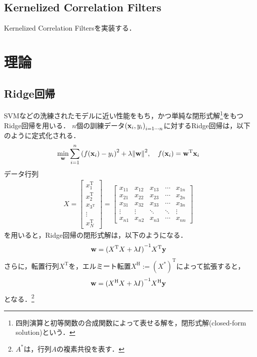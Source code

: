 \documentclass[11pt,a4j]{jarticle}
\newcommand\norm[1]{\left\lVert#1\right\rVert}
\begin{document}
    \subsection{Kernelized Correlation Filters}
      Kernelized Correlation Filters\cite{6870486}を実装する．



  \section{理論}
    \subsection{Ridge回帰}
      SVMなどの洗練されたモデルに近い性能をもち，かつ単純な閉形式解\footnote{四則演算と初等関数の合成関数によって表せる解を，閉形式解(closed-form solution)という．}をもつRidge回帰を用いる．
      $n$個の訓練データ${({\bf x}_i, y_i)}_{i = 1 \cdots n}$に対するRidge回帰は，以下のように定式化される．
      \begin{align}
        \min_{\bf w} \sum_{i=1}^{n} { \left( f({\bf x}_i) - y_i \right) }^{2} + \lambda {\norm{ \bf w }}^{2}, ~~~
        f({\bf x}_i) = {\bf w}^{\mathrm{T}} {\bf x}_i
      \end{align}
      データ行列
      \begin{align}
        X = 
        \left[
          \begin{array}{c}
            x_{1}^{\mathrm{T}} \\
            x_{2}^{\mathrm{T}} \\
            x_{3^{\mathrm{T}}} \\
            \vdots \\
            x_{N}^{\mathrm{T}} 
          \end{array}
        \right]
        =
        \left[
          \begin{array}{ccccc}
            x_{11} & x_{12} & x_{13} & \cdots & x_{1n} \\
            x_{21} & x_{22} & x_{23} & \cdots & x_{2n} \\
            x_{31} & x_{32} & x_{33} & \cdots & x_{3n} \\
            \vdots&\vdots&\ddots&\ddots&\vdots \\
            x_{n1} & x_{n2} & x_{n3} & \cdots & x_{nn} 
          \end{array}
        \right]
      \end{align}
      を用いると，Ridge回帰の閉形式解は，以下のようになる．
      \begin{align}
        {\bf w} = { ({X}^{\mathrm{T}} X + \lambda I) }^{-1} {X}^{\mathrm{T}} {\bf y}
      \end{align}
      さらに，転置行列$X^{\mathrm{T}}$を，エルミート転置$X^{\mathrm{H}} := {(X^{*})}^{\mathrm{T}}$によって拡張すると，
      \begin{align}
        {\bf w} = { ({X}^{\mathrm{H}} X + \lambda I) }^{-1} {X}^{\mathrm{H}} {\bf y}
      \end{align}
      となる．\footnote{$A^{*}$は，行列$A$の複素共役を表す．}
\end{document}
